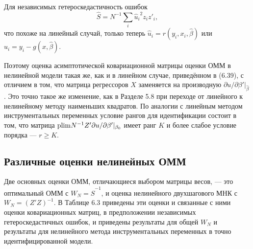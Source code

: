 Для независимых гетероскедастичность ошибок
\begin{equation}
\hat{S}=N^{-1} \sum_i {\hat{u}_i}^2 z_i z'_i,
\end{equation}
что похоже на линейный случай, только теперь $\hat{u}_i=r(y_i,x_i,\hat{\beta})$ или $\hat{u}_i=y_i-g(x,\hat{\beta})$.

Поэтому оценка асимптотической ковариационной матрицы оценки ОММ в нелинейной модели такая же, как и в линейном случае, приведённом в (6.39), с отличием в том, что матрица регрессоров $X$ заменяется на производную $\partial u / \partial \beta'|_{\hat{\beta}}$. Это точно такое же изменение, как в Разделе 5.8 при переходе от линейного к нелинейному методу наименьших квадратов. По аналогии с линейным методом инструментальных переменных условие рангов для идентификации состоит в том, что матрица $\mathrm{plim } N^{-1} Z' \partial u / \partial \beta'|_{\beta_0}$ имеет ранг $K$ и более слабое условие порядка --- $r \ge K$.

\subsection{Различные оценки нелинейных ОММ}

Две основных оценки ОММ, отличающиеся выбором матрицы весов, --- это оптимальный ОММ с $W_N={\hat{S}}^{-1}$, и оценка нелинейного двухшагового МНК с $W_N=(Z'Z)^{-1}$. В Таблице 6.3 приведены эти оценки и связанные с ними оценки ковариационных матриц, в предположении независимых гетероскедастичных ошибок, и приведены результаты для общей $W_N$ и результаты для нелинейного метода инструментальных переменных в точно идентифицированной модели.

